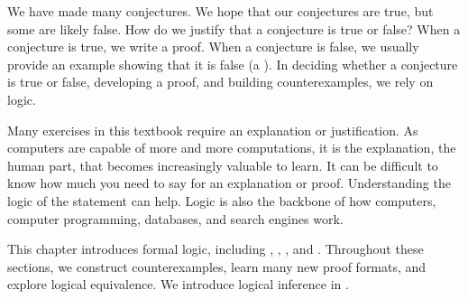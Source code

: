 We have made many conjectures.  We hope that our conjectures are true, but some are likely false. How do we justify that a conjecture is true or false?  When a conjecture is true, we write a proof.  When a conjecture is false, we usually provide an example showing that it is false (a ).  In deciding whether a conjecture is true or false,  developing a proof, and building counterexamples, we rely on logic. 

Many exercises in this textbook require an explanation or justification. As computers are capable of more and more computations, it is the explanation, the human part, that becomes increasingly valuable to learn.  It can be difficult to know how much you need to say for an explanation or proof.  Understanding the logic of the statement can help. Logic is also the backbone of how computers, computer programming, databases, and search engines work.  

This chapter introduces formal logic, including  {\seclogicconn},  {\secquant},  {\secifthen}, and  {\secconvcp}.  Throughout these sections, we construct counterexamples, learn many new proof formats, and explore logical equivalence.  We introduce logical inference in  {\secinference}.





